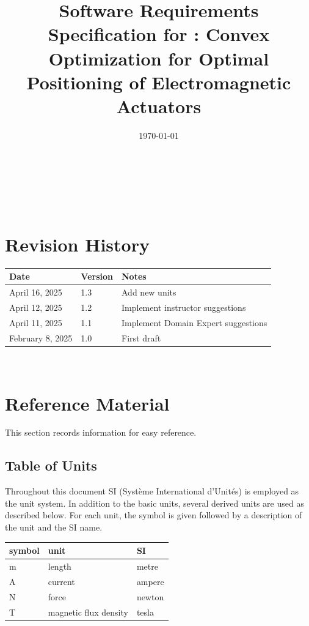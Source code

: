\documentclass[12pt]{article}
\begin{document}
\title{Software Requirements Specification for \progname: Convex Optimization for Optimal Positioning of Electromagnetic Actuators} 
\author{\authname}
\date{\today}
	
\maketitle

~\newpage


\tableofcontents

~\newpage

\section*{Revision History}

\begin{tabularx}{\textwidth}{p{3cm}p{2cm}X}
\toprule {\bf Date} & {\bf Version} & {\bf Notes}\\
\midrule
April 16, 2025 & 1.3 & Add new units \\
\midrule
April 12, 2025 & 1.2 & Implement instructor suggestions \\
\midrule
April 11, 2025 & 1.1 & Implement Domain Expert suggestions \\
\midrule
February 8, 2025 & 1.0 & First draft\\
\bottomrule
\end{tabularx}


~\newpage

\section{Reference Material}

This section records information for easy reference.

\subsection{Table of Units}

Throughout this document SI (Syst\`{e}me International d'Unit\'{e}s) is employed
as the unit system.  In addition to the basic units, several derived units are
used as described below.  For each unit, the symbol is given followed by a
description of the unit and the SI name.
~\newline

\renewcommand{\arraystretch}{1.2}
  \noindent \begin{tabular}{l l l} 
    \toprule		
    \textbf{symbol} & \textbf{unit} & \textbf{SI}\\
    \midrule 
    \si{\metre} & length & metre\\
    \si{\ampere} & current & ampere\\
    \si{\newton} & force & newton\\
    \si{\tesla} & magnetic flux density & tesla\\
    \bottomrule
  \end{tabular}
\end{document}
